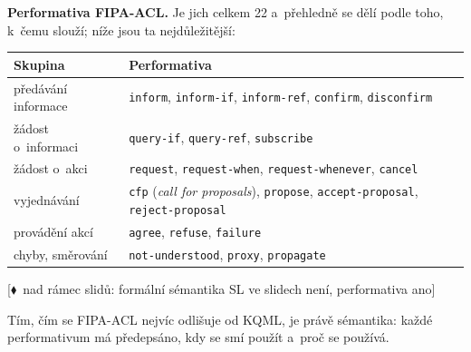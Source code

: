 \documentclass[11pt,a4paper]{article}
\theoremstyle{definition}
\newcommand{\mimoq}[1]{\textcolor{markcol}{\textsf{\footnotesize[$\blacklozenge$~nad rámec slidů: #1]}}}
\begin{document}
\textbf{Performativa FIPA-ACL.} Je jich celkem 22 a~přehledně se dělí podle toho, k~čemu
slouží; níže jsou ta nejdůležitější:
\begin{center}\small
\begin{tabular}{p{} p{}}
\toprule
\textbf{Skupina} & \textbf{Performativa} \\
\midrule
předávání informace & \texttt{inform}, \texttt{inform-if}, \texttt{inform-ref},
  \texttt{confirm}, \texttt{disconfirm} \\
žádost o~informaci & \texttt{query-if}, \texttt{query-ref}, \texttt{subscribe} \\
žádost o~akci & \texttt{request}, \texttt{request-when}, \texttt{request-whenever},
  \texttt{cancel} \\
vyjednávání & \texttt{cfp} (\emph{call for proposals}), \texttt{propose},
  \texttt{accept-proposal}, \texttt{reject-proposal} \\
provádění akcí & \texttt{agree}, \texttt{refuse}, \texttt{failure} \\
chyby, směrování & \texttt{not-understood}, \texttt{proxy}, \texttt{propagate} \\
\bottomrule
\end{tabular}
\end{center}

\noindent\mimoq{formální sémantika SL ve slidech není, performativa ano}

Tím, čím se FIPA-ACL nejvíc odlišuje od KQML, je právě sémantika: každé performativum má
předepsáno, kdy se smí použít a~proč se používá.
\end{document}
